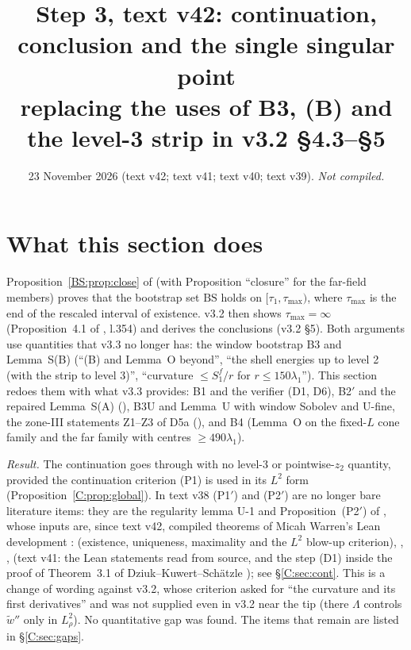 \documentclass[11pt]{article}
\title{Step 3, text v42: continuation, conclusion and the single singular point\\[2pt]\large replacing the uses of B3, (B) and the level-3 strip in v3.2 \S4.3--\S5}
\author{}\date{23 November 2026 (text v42; text v41; text v40; text v39). \emph{Not compiled.}}
\begin{document}
\maketitle
\fi

\section{What this section does}\label{C:sec:intro}
Proposition~\ref{BS:prop:close} of  (with  Proposition ``closure'' for the far-field members) proves that the bootstrap set $\mathrm{BS}$ holds on $[\tau_1,\tau_{\max})$, where $\tau_{\max}$ is the end of the rescaled interval of existence. v3.2 then shows $\tau_{\max}=\infty$ (Proposition~4.1 of , l.354) and derives the conclusions (v3.2 \S5). Both arguments use quantities that v3.3 no longer has: the window bootstrap B3 and Lemma~S(B) (``(B) and Lemma~O beyond'', ``the shell energies up to level 2 (with the strip to level 3)'', ``curvature $\le S_1^f/r$ for $r\le150\lambda_1$''). This section redoes them with what v3.3 provides: B1 and the verifier (D1, D6), B2$'$ and the repaired Lemma~S(A) (), B3U and Lemma~U with window Sobolev and U-fine, the zone-III statements Z1--Z3 of D5a (), and B4 (Lemma~O on the fixed-$L$ cone family and the far family with centres $\ge490\lambda_1$).

\noindent\emph{Result.} The continuation goes through with no level-3 or pointwise-$z_2$ quantity, provided the continuation criterion (P1) is used in its $L^2$ form (Proposition~\ref{C:prop:global}). In text v38 (P1$'$) and (P2$'$) are no longer bare literature items: they are the regularity lemma U-1 and Proposition~(P2$'$) of  \tH, whose inputs are, since text v42, compiled theorems of Micah Warren's Lean development \cite{CWFlow}:  (existence, uniqueness, maximality and the $L^2$ blow-up criterion), , ,  (text v41: the Lean statements read from source, and the step (D1) inside the proof of Theorem~3.1 of Dziuk--Kuwert--Sch\"atzle \cite{DKS2002}); see \S\ref{C:sec:cont}. This is a change of wording against v3.2, whose criterion asked for ``the curvature and its first derivatives'' and was not supplied even in v3.2 near the tip (there $\Lambda$ controls $\tilde w''$ only in $L^2_\rho$). No quantitative gap was found. The items that remain are listed in \S\ref{C:sec:gaps}.
\end{document}
